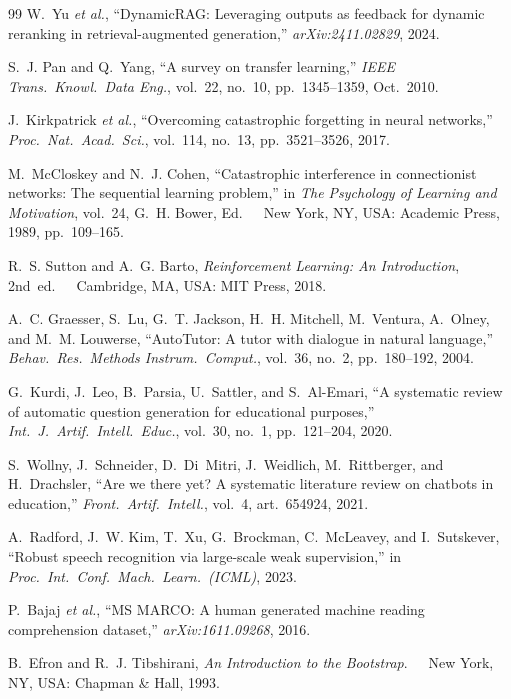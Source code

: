 \documentclass[journal]{IEEEtran}
\begin{document}
\begin{thebibliography}{99}
W.~Yu \emph{et al.},
``DynamicRAG: Leveraging outputs as feedback for dynamic reranking in
retrieval-augmented generation,''
\emph{arXiv:2411.02829}, 2024.

S.~J. Pan and Q.~Yang,
``A survey on transfer learning,''
\emph{IEEE Trans.\ Knowl.\ Data Eng.}, vol.~22, no.~10,
pp.~1345--1359, Oct.~2010.

J.~Kirkpatrick \emph{et al.},
``Overcoming catastrophic forgetting in neural networks,''
\emph{Proc.\ Nat.\ Acad.\ Sci.}, vol.~114, no.~13, pp.~3521--3526,
2017.

M.~McCloskey and N.~J. Cohen,
``Catastrophic interference in connectionist networks: The sequential
learning problem,''
in \emph{The Psychology of Learning and Motivation}, vol.~24,
G.~H. Bower, Ed.\ \ \ New York, NY, USA: Academic Press, 1989,
pp.~109--165.

R.~S. Sutton and A.~G. Barto,
\emph{Reinforcement Learning: An Introduction}, 2nd~ed.\ \ \
Cambridge, MA, USA: MIT Press, 2018.

A.~C. Graesser, S.~Lu, G.~T. Jackson, H.~H. Mitchell, M.~Ventura,
A.~Olney, and M.~M. Louwerse,
``AutoTutor: A tutor with dialogue in natural language,''
\emph{Behav.\ Res.\ Methods Instrum.\ Comput.}, vol.~36, no.~2,
pp.~180--192, 2004.

G.~Kurdi, J.~Leo, B.~Parsia, U.~Sattler, and S.~Al-Emari,
``A systematic review of automatic question generation for educational
purposes,''
\emph{Int.\ J.\ Artif.\ Intell.\ Educ.}, vol.~30, no.~1, pp.~121--204,
2020.

S.~Wollny, J.~Schneider, D.~Di~Mitri, J.~Weidlich, M.~Rittberger, and
H.~Drachsler,
``Are we there yet? A systematic literature review on chatbots in
education,''
\emph{Front.\ Artif.\ Intell.}, vol.~4, art.~654924, 2021.

A.~Radford, J.~W. Kim, T.~Xu, G.~Brockman, C.~McLeavey, and
I.~Sutskever,
``Robust speech recognition via large-scale weak supervision,''
in \emph{Proc.\ Int.\ Conf.\ Mach.\ Learn.\ (ICML)}, 2023.

P.~Bajaj \emph{et al.},
``MS MARCO: A human generated machine reading comprehension dataset,''
\emph{arXiv:1611.09268}, 2016.

B.~Efron and R.~J. Tibshirani,
\emph{An Introduction to the Bootstrap}.\ \ \
New York, NY, USA: Chapman \& Hall, 1993.


\end{thebibliography}
\end{document}
